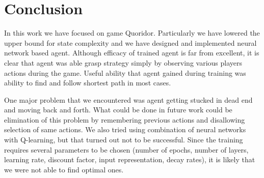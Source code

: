 \chapter{Conclusion}\label{chap:6}

In this work we have focused on game Quoridor. Particularly we have lowered the
upper bound for state complexity and we have designed and implemented neural
network based agent. Although efficacy of trained agent is far from excellent,
it is clear that agent was able grasp strategy simply by observing various
players actions during the game. Useful ability that agent gained during
training was ability to find and follow shortest path in most cases.

One major problem that we encountered was agent getting stucked in dead end
and moving back and forth. What could be done in future work could be
elimination of this problem by remembering previous actions and disallowing
selection of same actions. We also tried using combination of neural networks
with Q-learning, but that turned out not to be successful. Since the training
requires several parameters to be chosen (number of epochs, number of layers,
learning rate, discount factor, input representation, decay rates), it is
likely that we were not able to find optimal ones.

